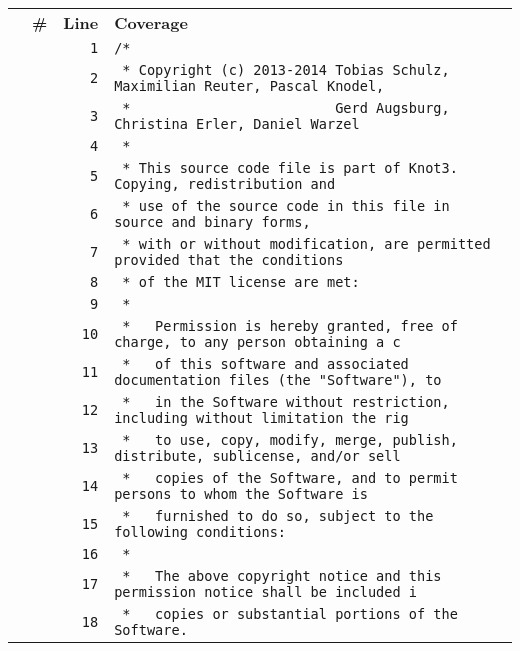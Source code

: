 \documentclass[a4paper,10pt]{article}
\begin{document}
\begin{longtable}[l]{lrrl}
\textbf{} & \textbf{\#} & \textbf{Line} & \textbf{Coverage}\\
\cellcolor{gray} &  & \verb~1~ & \verb~/*~\\
\cellcolor{gray} &  & \verb~2~ & \verb~ * Copyright (c) 2013-2014 Tobias Schulz, Maximilian Reuter, Pascal Knodel,~\\
\cellcolor{gray} &  & \verb~3~ & \verb~ *                         Gerd Augsburg, Christina Erler, Daniel Warzel~\\
\cellcolor{gray} &  & \verb~4~ & \verb~ *~\\
\cellcolor{gray} &  & \verb~5~ & \verb~ * This source code file is part of Knot3. Copying, redistribution and~\\
\cellcolor{gray} &  & \verb~6~ & \verb~ * use of the source code in this file in source and binary forms,~\\
\cellcolor{gray} &  & \verb~7~ & \verb~ * with or without modification, are permitted provided that the conditions~\\
\cellcolor{gray} &  & \verb~8~ & \verb~ * of the MIT license are met:~\\
\cellcolor{gray} &  & \verb~9~ & \verb~ *~\\
\cellcolor{gray} &  & \verb~10~ & \verb~ *   Permission is hereby granted, free of charge, to any person obtaining a c~\\
\cellcolor{gray} &  & \verb~11~ & \verb~ *   of this software and associated documentation files (the "Software"), to ~\\
\cellcolor{gray} &  & \verb~12~ & \verb~ *   in the Software without restriction, including without limitation the rig~\\
\cellcolor{gray} &  & \verb~13~ & \verb~ *   to use, copy, modify, merge, publish, distribute, sublicense, and/or sell~\\
\cellcolor{gray} &  & \verb~14~ & \verb~ *   copies of the Software, and to permit persons to whom the Software is~\\
\cellcolor{gray} &  & \verb~15~ & \verb~ *   furnished to do so, subject to the following conditions:~\\
\cellcolor{gray} &  & \verb~16~ & \verb~ *~\\
\cellcolor{gray} &  & \verb~17~ & \verb~ *   The above copyright notice and this permission notice shall be included i~\\
\cellcolor{gray} &  & \verb~18~ & \verb~ *   copies or substantial portions of the Software.~\\

\end{longtable}
\end{document}

